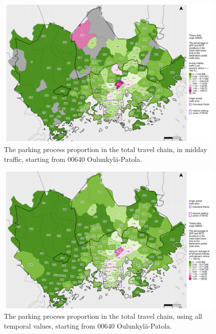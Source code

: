 \begin{figure}
    \centering
    \includegraphics[trim={0.9cm 0.3cm 0.25cm 0.3cm},clip,width=\textwidth]{images/compare_traveltimes_mapfill-msc_m_pct_fromzip-00640_28-09-2020.png}
    \caption[Parking process proportion from Oulunkylä-Patola, midday traffic]{The parking process proportion in the total travel chain, in midday traffic, starting from 00640 Oulunkylä-Patola.}%
    \label{fig:compare_msc_m_pct_00640}%
\end{figure}

\begin{figure}
    \centering
    \includegraphics[trim={0.9cm 0.3cm 0.25cm 0.3cm},clip,width=\textwidth]{images/compare_traveltimes_mapfill-msc_all_pct_fromzip-00640_28-09-2020.png}
    \caption[Parking process proportion from Oulunkylä-Patola, all temporal values]{The parking process proportion in the total travel chain, using all temporal values, starting from 00640 Oulunkylä-Patola.}%
    \label{fig:compare_msc_all_pct_00640}%
\end{figure}
\restoregeometry

